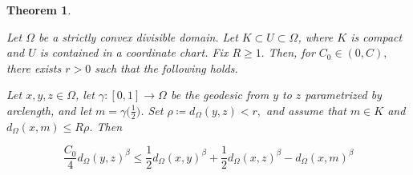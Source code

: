 \documentclass[letterpaper, 11pt, reqno]{amsart}
\newtheorem{thm}{Theorem}[section]
\theoremstyle{definition}
\begin{document}
\begin{thm}\label{localishBUC}

Let $\Omega$ be a strictly convex divisible domain. Let $K \subset U \subset \Omega$, where $K$ is compact and $U$ is contained in a coordinate chart. Fix $R \geq 1.$ Then, for $C_0 \in (0,C),$ there exists $r>0$ such that the following holds.

Let $x, y, z\in \Omega$, let $\gamma:[0,1]\longrightarrow  \Omega$ be the geodesic from $y$ to $z$ parametrized by arclength, and let $m=\gamma\big(\frac{1}{2}\big)$. Set $\rho \coloneqq d_\Omega(y,z) < r,$ and assume that $m \in K$ and $d_\Omega(x,m) \leq R\rho$. Then

\begin{equation}\label{localhilbertbuc}
        \frac{C_0}{4}d_\Omega(y,z)^\beta \leq \frac{1}{2}d_\Omega(x,y)^\beta +
\frac{1}{2}d_\Omega(x,z)^\beta  - d_\Omega(x,m)^\beta
\end{equation}
\end{thm}
\end{document}
